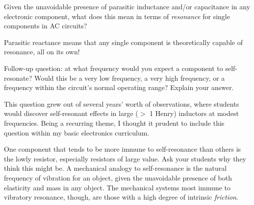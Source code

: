 

Given the unavoidable presence of parasitic inductance and/or capacitance in any electronic component, what does this mean in terms of {\it resonance} for single components in AC circuits?







Parasitic reactance means that any single component is theoretically capable of resonance, all on its own!

\vskip 10pt

Follow-up question: at what frequency would you expect a component to self-resonate?  Would this be a very low frequency, a very high frequency, or a frequency within the circuit's normal operating range?  Explain your answer.







This question grew out of several years' worth of observations, where students would discover self-resonant effects in large ($>$ 1 Henry) inductors at modest frequencies.  Being a recurring theme, I thought it prudent to include this question within my basic electronics curriculum.

One component that tends to be more immune to self-resonance than others is the lowly resistor, especially resistors of large value.  Ask your students why they think this might be.  A mechanical analogy to self-resonance is the natural frequency of vibration for an object, given the unavoidable presence of both elasticity and mass in any object.  The mechanical systems most immune to vibratory resonance, though, are those with a high degree of intrinsic {\it friction}.




